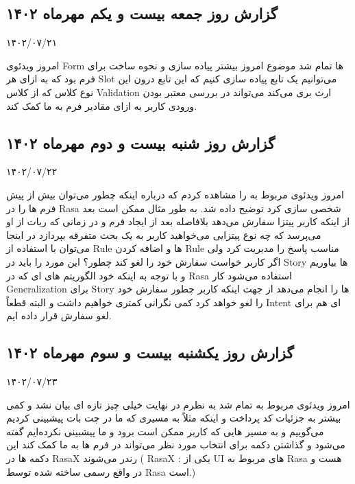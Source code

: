 \subsection{گزارش روز جمعه بیست و یکم مهرماه ۱۴۰۲}

۱۴۰۲/۰۷/۲۱

امروز ویدئوی Form ها تمام شد موضوع امروز بیشتر پیاده سازی و نحوه ساخت  برای فرم بود که به ازای هر Slot می‌توانیم یک تابع پیاده سازی کنیم که این تابع درون این نوع کلاس که از کلاس Validation ارث بری می‌کند می‌تواند در بررسی معتبر بودن ورودی کاربر به ازای مقادیر فرم به ما کمک کند.


\subsection{گزارش روز شنبه بیست و دوم مهرماه ۱۴۰۲}

۱۴۰۲/۰۷/۲۲

امروز ویدئوی مربوط به  را مشاهده کردم که درباره اینکه چطور می‌توان بیش از پیش فرم ها را در Rasa شخصی سازی کرد توضیح داده شد. به طور مثال ممکن است بعد از اینکه کاربر پیتزا سفارش می‌دهد بلافاصله بعد از ایجاد فرم و در زمانی که ربات از او می‌پرسد که چه نوع پیتزایی می‌خواهید کاربر به یک بحث متفرقه بپردازد در اینجا می‌توان با استفاده از Rule ها و اضافه کردن Rule مناسب پاسخ را مدیریت کرد ولی اگر کاربر خواست سفارش خود را لغو کند چطور؟ این مورد را باید در Story ها بیاوریم و با توجه به اینکه خود الگوریتم های  ای که در Rasa استفاده می‌شود کار Generalization برای Story ها را انجام می‌دهد از جهت اینکه کاربر چطور سفارش خود را لغو خواهد کرد کمی نگرانی کمتری خواهیم داشت و البته قطعاً Intent ای هم برای لغو سفارش قرار داده ایم.


\subsection{گزارش روز یکشنبه بیست و سوم مهرماه ۱۴۰۲}

۱۴۰۲/۰۷/۲۳

امروز ویدئوی مربوط به  تمام شد به نظرم در نهایت خیلی چیز تازه ای بیان نشد و کمی بیشتر به جزئیات کد پرداخت و اینکه مثلاً به مسیری که ما در چت بات پیشبینی کردیم  می‌گوییم و به مسیر هایی که کاربر ممکن است برود و ما پیشبینی نکرده‌ایم  گفته می‌شود و گذاشتن دکمه برای انتخاب مورد نظر می‌تواند در فرم ها به ما کمک کند این دکمه ها در RasaX رندر می‌شوند ( RasaX : یکی از UI های مربوط به Rasa هست و در واقع  رسمی ساخته شده توسط Rasa است.)



